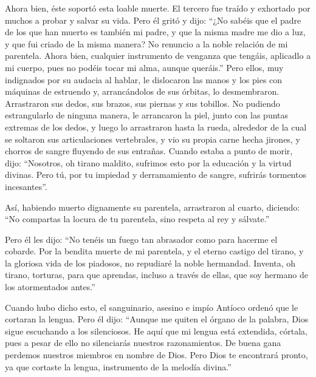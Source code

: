  Ahora bien, éste soportó esta loable muerte. El tercero
fue traído y exhortado por muchos a probar y salvar su vida.
 Pero él gritó y dijo: ``¿No sabéis que el padre de los
que han muerto es también mi padre, y que la misma madre me dio a luz, y
que fui criado de la misma manera?  No renuncio a la noble
relación de mi parentela.  Ahora bien, cualquier
instrumento de venganza que tengáis, aplicadlo a mi cuerpo, pues no
podéis tocar mi alma, aunque queráis.''  Pero ellos, muy
indignados por su audacia al hablar, le dislocaron las manos y los pies
con máquinas de estruendo y, arrancándolos de sus órbitas, lo
desmembraron.  Arrastraron sus dedos, sus brazos, sus
piernas y sus tobillos.  No pudiendo estrangularlo de
ninguna manera, le arrancaron la piel, junto con las puntas extremas de
los dedos, y luego lo arrastraron hasta la rueda, 
alrededor de la cual se soltaron sus articulaciones vertebrales, y vio
su propia carne hecha jirones, y chorros de sangre fluyendo de sus
entrañas.  Cuando estaba a punto de morir, dijo:
 ``Nosotros, oh tirano maldito, sufrimos esto por la
educación y la virtud divinas.  Pero tú, por tu impiedad
y derramamiento de sangre, sufrirás tormentos incesantes''.

 Así, habiendo muerto dignamente su parentela,
arrastraron al cuarto, diciendo:  ``No compartas la
locura de tu parentela, sino respeta al rey y sálvate.''

 Pero él les dijo: ``No tenéis un fuego tan abrasador
como para hacerme el cobarde.  Por la bendita muerte de
mi parentela, y el eterno castigo del tirano, y la gloriosa vida de los
piadosos, no repudiaré la noble hermandad.  Inventa, oh
tirano, torturas, para que aprendas, incluso a través de ellas, que soy
hermano de los atormentados antes.''

 Cuando hubo dicho esto, el sanguinario, asesino e impío
Antíoco ordenó que le cortaran la lengua.  Pero él dijo:
``Aunque me quiten el órgano de la palabra, Dios sigue escuchando a los
silenciosos.  He aquí que mi lengua está extendida,
córtala, pues a pesar de ello no silenciarás nuestros razonamientos.
 De buena gana perdemos nuestros miembros en nombre de
Dios.  Pero Dios te encontrará pronto, ya que cortaste la
lengua, instrumento de la melodía divina.''

